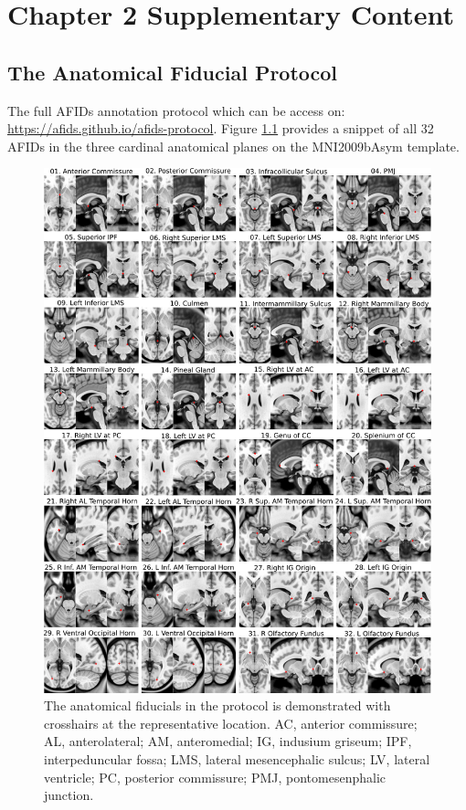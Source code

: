 \chapter{Chapter 2 Supplementary Content}\label{app:suppcontent}
\newpage

\section{The Anatomical Fiducial Protocol}\label{app:AFIDs_supp}
The full AFIDs annotation protocol which can be access on: \url{https://afids.github.io/afids-protocol}. Figure \ref{fig:figuresupall_afids} provides a snippet of all 32 AFIDs in the three cardinal anatomical planes on the MNI2009bAsym template. 

\begin{figure}[hbt!]
    \centering
    \includegraphics[width=0.8\linewidth]{figs/figuresupall_afids.png}
    \caption{The anatomical fiducials in the protocol is demonstrated with crosshairs at the representative location. AC, anterior commissure; AL, anterolateral; AM, anteromedial; IG, indusium griseum; IPF, interpeduncular fossa; LMS, lateral mesencephalic sulcus; LV, lateral ventricle; PC, posterior commissure; PMJ, pontomesenphalic junction.}
    \label{fig:figuresupall_afids}
\end{figure}


